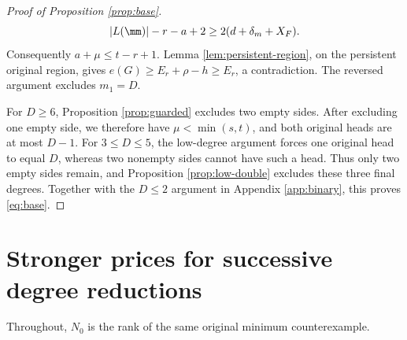 \documentclass[11pt,a4paper]{article}
\theoremstyle{definition}
\begin{document}
\begin{proof}[Proof of Proposition \ref{prop:base}]
\[
 |L(\mm)|-r-a+2\ge2(d+\delta_m+X_F).
\]
Consequently $a+\mu\le t-r+1$.
Lemma \ref{lem:persistent-region}, on the persistent original region, gives
$e(G)\ge E_r+\rho-h\ge E_r$, a contradiction.
The reversed argument excludes $m_1=D$.

For $D\ge6$, Proposition \ref{prop:guarded} excludes two empty sides.
After excluding one empty side, we therefore have $\mu<\min(s,t)$, and both original heads are at most $D-1$.
For $3\le D\le5$, the low-degree argument forces one original head to equal $D$, whereas two nonempty sides cannot have such a head.
Thus only two empty sides remain, and Proposition \ref{prop:low-double} excludes these three final degrees.
Together with the $D\le2$ argument in Appendix \ref{app:binary}, this proves \eqref{eq:base}.
\end{proof}
\section{Stronger prices for successive degree reductions}\label{app:stage-prices}
Throughout, $N_0$ is the rank of the same original minimum counterexample.
\end{document}
